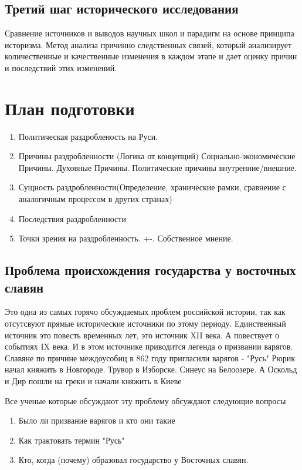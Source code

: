 \documentclass[a4paper]{article}
\begin{document}
\subsection{Третий шаг исторического исследования}
Сравнение источников и выводов научных школ и парадигм на основе принципа историзма. Метод анализа причинно следственных связей, который анализирует количественные и качественные изменения в каждом этапе и дает оценку причин и последствий этих изменений.
\section{План подготовки }
\begin{enumerate}
\item Политическая раздробленость на Руси.
\item Причины раздробленности (Логика от концепций)
    Социально-экономические Причины.
    Духовные Причины.
    Политические причины внутренние/внешние.
\item Сущность раздробленности(Определение, хранические рамки, сравнение с аналогичным процессом в других странах)
\item Последствия раздробленности
\item Точки зрения на раздробленность. +-. Собственное мнение.
\end{enumerate}
\subsection{Проблема происхождения государства у восточных славян}
Это одна из самых горячо обсуждаемых проблем российской истории, так как отсутсвуют прямые исторические источники по этому периоду.
Единственный источник это повесть временных лет, это источник XII века. А повествует о событиях IX века. И в этом источнике приводится легенда о призвании варягов.
Славяне по причине междоусобиц в 862 году пригласили варягов - "Русь"
Рюрик начал княжить в Новгороде. Трувор в Изборске. Синеус на Белоозере.
А Оскольд и Дир пошли на греки и начали княжить в Киеве

Все ученые которые обсуждают эту проблему обсуждают следующие вопросы
\begin{enumerate}
\item Было ли призвание варягов и кто они такие
\item Как трактовать термин "Русь"
\item Кто, когда (почему) образовал государство у Восточных славян.
\end{enumerate}
\end{document}
